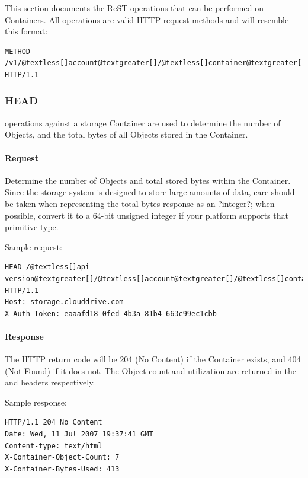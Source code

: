 \documentclass[letterpaper,10pt,english]{manual}
\begin{document}
This section documents the ReST operations that can be performed on
Containers. All operations are valid HTTP request methods and will
resemble this format:

\begin{Verbatim}[commandchars=@\[\]]
METHOD /v1/@textless[]account@textgreater[]/@textless[]container@textgreater[] HTTP/1.1
\end{Verbatim}


\subsubsection{HEAD}

 operations against a storage Container are used to determine the
number of Objects, and the total bytes of all Objects stored in the
Container.


\paragraph{Request}

Determine the number of Objects and total stored bytes within the
Container.  Since the storage system is designed to store large amounts
of data, care should be taken when representing the total bytes response
as an ?integer?; when possible, convert it to a 64-bit unsigned integer
if your platform supports that primitive type.

Sample request:

\begin{Verbatim}[commandchars=@\[\]]
HEAD /@textless[]api version@textgreater[]/@textless[]account@textgreater[]/@textless[]container@textgreater[] HTTP/1.1
Host: storage.clouddrive.com
X-Auth-Token: eaaafd18-0fed-4b3a-81b4-663c99ec1cbb
\end{Verbatim}


\paragraph{Response}

The HTTP return code will be 204 (No Content) if the Container exists,
and 404 (Not Found) if it does not. The Object count and utilization are
returned in the  and 
headers respectively.

Sample response:

\begin{Verbatim}[commandchars=@\[\]]
HTTP/1.1 204 No Content
Date: Wed, 11 Jul 2007 19:37:41 GMT
Content-type: text/html
X-Container-Object-Count: 7
X-Container-Bytes-Used: 413
\end{Verbatim}
\end{document}
